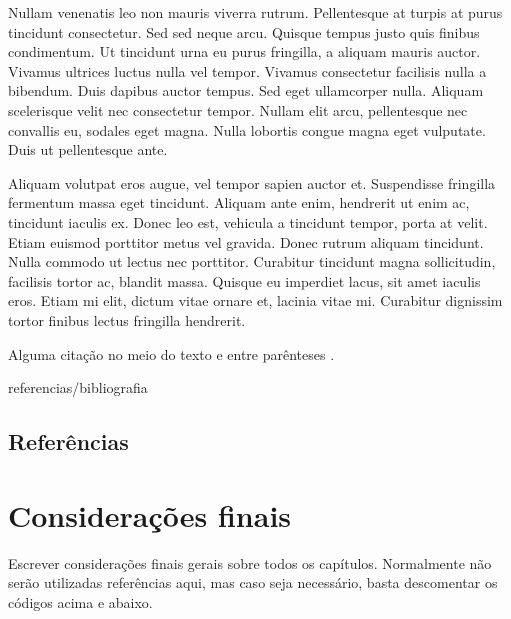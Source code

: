 \documentclass[book,A4paper,10pt,twoside,oldfontcommands]{memoir}\usepackage[]{graphicx}\usepackage[usenames,dvipsnames]{color}
\begin{document}
\begin{btUnit}
Nullam venenatis leo non mauris viverra rutrum. Pellentesque at turpis
at purus tincidunt consectetur. Sed sed neque arcu. Quisque tempus
justo quis finibus condimentum. Ut tincidunt urna eu purus fringilla,
a aliquam mauris auctor. Vivamus ultrices luctus nulla vel tempor.
Vivamus consectetur facilisis nulla a bibendum. Duis dapibus auctor
tempus. Sed eget ullamcorper nulla. Aliquam scelerisque velit nec
consectetur tempor. Nullam elit arcu, pellentesque nec convallis eu,
sodales eget magna. Nulla lobortis congue magna eget vulputate. Duis
ut pellentesque ante.

Aliquam volutpat eros augue, vel tempor sapien auctor et. Suspendisse
fringilla fermentum massa eget tincidunt. Aliquam ante enim, hendrerit
ut enim ac, tincidunt iaculis ex. Donec leo est, vehicula a tincidunt
tempor, porta at velit. Etiam euismod porttitor metus vel gravida.
Donec rutrum aliquam tincidunt. Nulla commodo ut lectus nec porttitor.
Curabitur tincidunt magna sollicitudin, facilisis tortor ac, blandit
massa. Quisque eu imperdiet lacus, sit amet iaculis eros. Etiam mi
elit, dictum vitae ornare et, lacinia vitae mi. Curabitur dignissim
tortor finibus lectus fringilla hendrerit.

Alguma citação no meio do texto \citet{Mood1974} e entre parênteses
\citep{Millar2000}.

\begin{btSect}{referencias/bibliografia}
\section*{Referências}
\btPrintCited
\end{btSect}

\end{btUnit}


\chapter{Considerações finais}

Escrever considerações finais gerais sobre todos os capítulos.
Normalmente não serão utilizadas referências aqui, mas caso seja
necessário, basta descomentar os códigos acima e abaixo.

\end{document}
